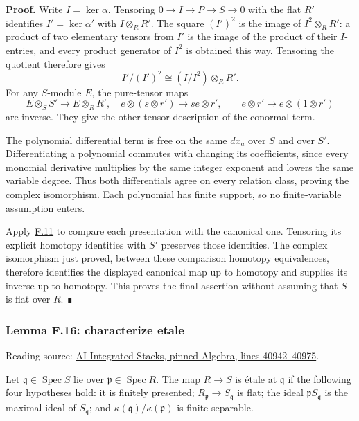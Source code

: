 \documentclass[11pt,a4paper,openany]{report}
\begin{document}
\textbf{Proof.} Write \(I=\ker\alpha\). Tensoring \(0\to I\to P\to S\to0\) with the flat \(R'\) identifies \(I'=\ker\alpha'\) with \(I\otimes_RR'\). The square \((I')^2\) is the image of \(I^2\otimes_RR'\): a product of two elementary tensors from \(I'\) is the image of the product of their \(I\)-entries, and every product generator of \(I^2\) is obtained this way. Tensoring the quotient therefore gives \[I'/(I')^2\cong(I/I^2)\otimes_RR'.\] For any \(S\)-module \(E\), the pure-tensor maps \[E\otimes_SS'\longrightarrow E\otimes_RR',
\quad e\otimes(s\otimes r')\longmapsto se\otimes r',
\qquad e\otimes r'\longmapsto e\otimes(1\otimes r')\] are inverse. They give the other tensor description of the conormal term.

The polynomial differential term is free on the same \(dx_a\) over \(S\) and over \(S'\). Differentiating a polynomial commutes with changing its coefficients, since every monomial derivative multiplies by the same integer exponent and lowers the same variable degree. Thus both differentials agree on every relation class, proving the complex isomorphism. Each polynomial has finite support, so no finite-variable assumption enters.

Apply \hyperref[AG-RG-S05-algebra-lemma-NL-homotopy]{F.11} to compare each presentation with the canonical one. Tensoring its explicit homotopy identities with \(S'\) preserves those identities. The complex isomorphism just proved, between these comparison homotopy equivalences, therefore identifies the displayed canonical map up to homotopy and supplies its inverse up to homotopy. This proves the final assertion without assuming that \(S\) is flat over \(R\). ∎

\label{AG-RG-S05-algebra-lemma-characterize-etale}

\subsubsection{Lemma F.16: characterize etale}\label{AG-RG-S05-lemma-f.16-characterize-etale}

Reading source: \href{https://github.com/KokunoYumeto/unofficial-stacks-project-ai-drafts/blob/565b10e987aba5969b21145a0833f42d69f96790/algebra.tex\#L40942-L40975}{AI Integrated Stacks, pinned Algebra, lines 40942--40975}.

Let \(\mathfrak q\in\operatorname{Spec}S\) lie over \(\mathfrak p\in\operatorname{Spec}R\). The map \(R\to S\) is étale at \(\mathfrak q\) if the following four hypotheses hold: it is finitely presented; \(R_{\mathfrak p}\to S_{\mathfrak q}\) is flat; the ideal \(\mathfrak pS_{\mathfrak q}\) is the maximal ideal of \(S_{\mathfrak q}\); and \(\kappa(\mathfrak q)/\kappa(\mathfrak p)\) is finite separable.
\end{document}
